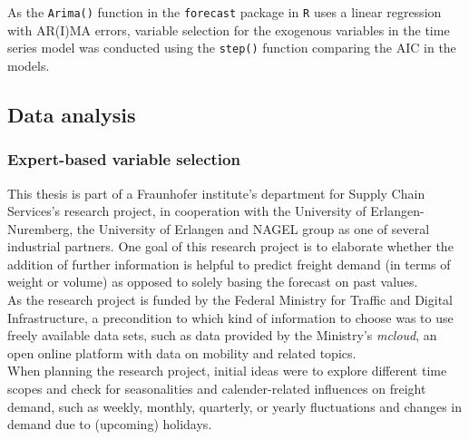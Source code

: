 \documentclass[a4paper, 11pt]{article}
\begin{document}
As the \texttt{Arima()} function in the \texttt{forecast} package in \texttt{R} uses a linear regression with AR(I)MA errors, variable selection for the exogenous variables in the time series model was conducted using the \texttt{step()} function comparing the AIC in the models.

\subsection{Data analysis}

\subsubsection{Expert-based variable selection}

This thesis is part of a Fraunhofer institute's department for Supply Chain Services's research project, in cooperation with the University of Erlangen-Nuremberg, the University of Erlangen and NAGEL group as one of several industrial partners. 
One goal of this research project is to elaborate whether the addition of further information is helpful to predict freight demand (in terms of weight or volume) as opposed to solely basing the forecast on past values.\\
As the research project is funded by the Federal Ministry for Traffic and Digital Infrastructure, a precondition to which kind of information to choose was to use freely available data sets, such as data provided by the Ministry's \textit{mcloud}, an open online platform with data on mobility and related topics. \\
When planning the research project, initial ideas were to explore different time scopes and check for seasonalities and calender-related influences on freight demand, such as weekly, monthly, quarterly, or yearly fluctuations and changes in demand due to (upcoming) holidays. \



\end{document}
